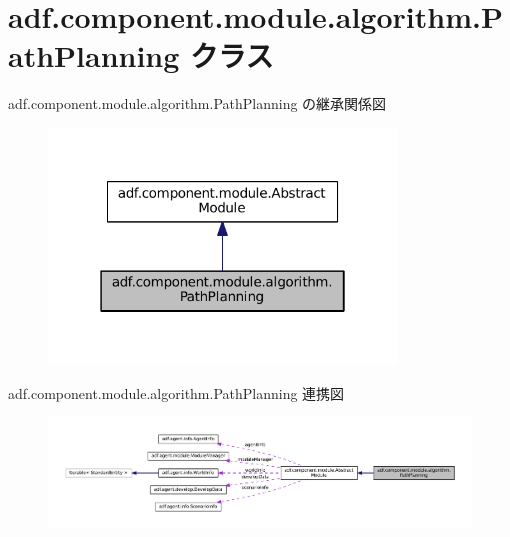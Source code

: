 \hypertarget{classadf_1_1component_1_1module_1_1algorithm_1_1PathPlanning}{}\section{adf.\+component.\+module.\+algorithm.\+Path\+Planning クラス}
\label{classadf_1_1component_1_1module_1_1algorithm_1_1PathPlanning}


adf.\+component.\+module.\+algorithm.\+Path\+Planning の継承関係図
\nopagebreak
\begin{figure}[H]
\begin{center}
\leavevmode
\includegraphics[width=262pt]{classadf_1_1component_1_1module_1_1algorithm_1_1PathPlanning__inherit__graph}
\end{center}
\end{figure}


adf.\+component.\+module.\+algorithm.\+Path\+Planning 連携図
\nopagebreak
\begin{figure}[H]
\begin{center}
\leavevmode
\includegraphics[width=350pt]{classadf_1_1component_1_1module_1_1algorithm_1_1PathPlanning__coll__graph}
\end{center}
\end{figure}
